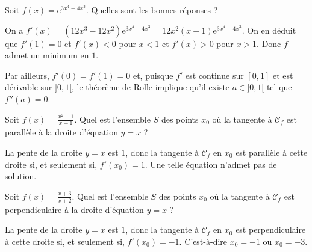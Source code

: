 \begin{question}

Soit $\displaystyle f(x)=\mathrm{e}^{3x^4-4x^3}$. Quelles sont les bonnes réponses ?
\begin{answers}  
    \good{Il existe $a\in ]0,1[$ tel que $f''(a)=0$.}
\end{answers}
\begin{explanations}
On a $f'(x)=(12x^3-12x^2)\mathrm{e}^{3x^4-4x^3}=12x^2(x-1)\mathrm{e}^{3x^4-4x^3}$. On en déduit que $f'(1)=0$ et $f'(x)<0$ pour $x<1$ et $f'(x)>0$ pour $x>1$. Donc $f$ admet un minimum en $1$.

Par ailleurs, $f'(0)=f'(1)=0$ et, puisque $f'$ est continue sur $[0,1]$ et est dérivable sur $]0,1[$, le théorème de Rolle implique qu'il existe $a\in ]0,1[$ tel que $f''(a)=0$.
\end{explanations}
\end{question}






\begin{question}

Soit $\displaystyle f(x)=\frac{x^2+1}{x+1}$. Quel est l'ensemble $S$ des points $x_0$ où la tangente à $\mathscr{C}_f$ est parallèle à la droite d'équation $y=x$ ?
\begin{answers}  
\end{answers}
\begin{explanations}
La pente de la droite $y=x$ est $1$, donc la tangente à $\mathscr{C}_f$ en $x_0$ est parallèle à cette droite si, et seulement si, $f'(x_0)=1$. Une telle équation n'admet pas de solution.
\end{explanations}
\end{question}



\begin{question}

Soit $\displaystyle f(x)=\frac{x+3}{x+2}$. Quel est l'ensemble $S$ des points $x_0$ où la tangente à $\mathscr{C}_f$ est perpendiculaire à la droite d'équation $y=x$ ?
\begin{answers}  
\end{answers}
\begin{explanations}
La pente de la droite $y=x$ est $1$, donc la tangente à $\mathscr{C}_f$ en $x_0$ est perpendiculaire à cette droite si, et seulement si, $f'(x_0)=-1$. C'est-à-dire $x_0=-1$ ou $x_0=-3$.
\end{explanations}
\end{question}




